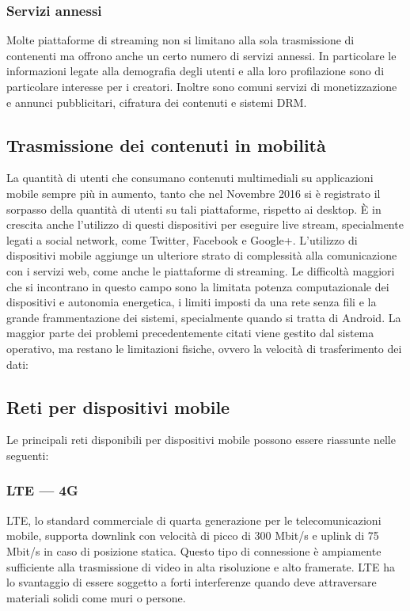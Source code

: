 		\subsubsection{Servizi annessi}
			Molte piattaforme di streaming non si limitano alla sola trasmissione di contenenti ma offrono anche un certo numero di servizi annessi. In particolare le informazioni legate alla demografia degli utenti e alla loro profilazione sono di particolare interesse per i creatori. Inoltre sono comuni servizi di monetizzazione e annunci pubblicitari, cifratura dei contenuti e sistemi \gls{DRM}.\@


	\subsection{Trasmissione dei contenuti in mobilità}
			La quantità di utenti che consumano contenuti multimediali su applicazioni mobile sempre più in aumento, tanto che nel Novembre 2016 si è registrato il sorpasso della quantità di utenti su tali piattaforme, rispetto ai desktop. È in crescita anche l'utilizzo di questi dispositivi per eseguire live stream, specialmente legati a social network, come Twitter, Facebook e Google+.
			L'utilizzo di dispositivi mobile aggiunge un ulteriore strato di complessità alla comunicazione con i servizi web, come anche le piattaforme di streaming.
			Le difficoltà maggiori che si incontrano in questo campo sono la limitata potenza computazionale dei dispositivi e autonomia energetica, i limiti imposti da una rete senza fili e la grande frammentazione dei sistemi, specialmente quando si tratta di Android.
			La maggior parte dei problemi precedentemente citati viene gestito dal sistema operativo, ma restano le limitazioni fisiche, ovvero la velocità di trasferimento dei dati:
	\subsection{Reti per dispositivi mobile}
			Le principali reti disponibili per dispositivi mobile possono essere riassunte nelle seguenti:
		\subsubsection{LTE --- 4G}
			\gls{LTE}, lo standard commerciale di quarta generazione per le telecomunicazioni mobile, supporta downlink con velocità di picco di 300 Mbit/s e uplink di 75 Mbit/s in caso di posizione statica. Questo tipo di connessione è ampiamente sufficiente alla trasmissione di video in alta risoluzione e alto framerate. \gls{LTE} ha lo svantaggio di essere soggetto a forti interferenze quando deve attraversare materiali solidi come muri o persone.
